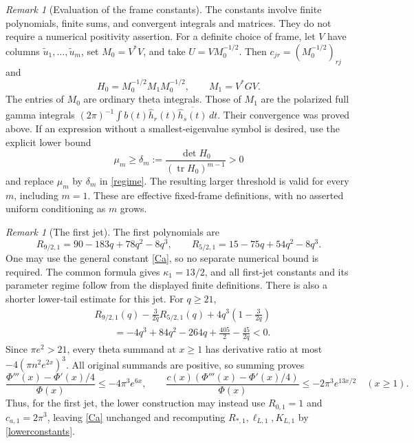 \documentclass[11pt]{article}
\theoremstyle{remark}
\newtheorem{remark}[theorem]{Remark}
\newcommand{\dd}{\,d}
\newcommand{\tr}{\operatorname{tr}}
\begin{document}
\begin{remark}[Evaluation of the frame constants]
The constants involve finite polynomials, finite sums, and
convergent integrals and matrices. They do not require a numerical
positivity assertion. For a definite choice of frame, let
\(V\) have columns \(\widetilde u_1,\ldots,\widetilde u_m\), set
\(M_0=V^*V\), and take \(U=VM_0^{-1/2}\).
Then \(c_{jr}=(M_0^{-1/2})_{rj}\) and
\[
 H_0=M_0^{-1/2}M_1M_0^{-1/2},\qquad
 M_1=V^*GV.
\]
The entries of \(M_0\) are ordinary theta integrals.
Those of \(M_1\) are the polarized full gamma integrals
\((2\pi)^{-1}\int b(t)\widehat h_r(t)
\overline{\widehat h_s(t)}\dd t\).
Their convergence was proved above.
If an expression without a smallest-eigenvalue symbol is desired,
use the explicit lower bound
\[
 \mu_m\ge \delta_m:=
       \frac{\det H_0}{(\tr H_0)^{m-1}}>0
\]
and replace \(\mu_m\) by \(\delta_m\) in \eqref{regime}.
The resulting larger threshold is valid for every \(m\), including
\(m=1\). These are effective fixed-frame definitions, with no
asserted uniform conditioning as \(m\) grows.
\end{remark}

\begin{remark}[The first jet]
The first polynomials are
\[
 R_{9/2,1}=90-183q+78q^2-8q^3,\qquad
 R_{5/2,1}=15-75q+54q^2-8q^3.
\]
One may use the general constant \eqref{Ca}, so no separate
numerical bound is required. The common formula gives
\(\kappa_1=13/2\), and all first-jet constants and its parameter
regime follow from the displayed finite definitions.
There is also a shorter lower-tail estimate for this jet.
For \(q\ge21\),
\begin{align*}
 &R_{9/2,1}(q)-\frac{3}{2q}R_{5/2,1}(q)
                       +4q^3\left(1-\frac3{2q}\right)\\
 &\hspace{2em}=-4q^3+84q^2-264q+\frac{405}{2}-\frac{45}{2q}<0.
\end{align*}
Since \(\pi e^2>21\), every theta summand at \(x\ge1\) has
derivative ratio at most \(-4(\pi n^2e^{2x})^3\).
All original summands are positive, so summing proves
\[
 \frac{\Phi'''(x)-\Phi'(x)/4}{\Phi(x)}
        \le-4\pi^3e^{6x},\qquad
 \frac{c(x)(\Phi'''(x)-\Phi'(x)/4)}{\Phi(x)}
        \le-2\pi^3e^{13x/2}\quad(x\ge1).
\]
Thus, for the first jet, the lower construction may instead use
\(R_{0,1}=1\) and \(c_{a,1}=2\pi^3\), leaving
\eqref{Ca} unchanged and recomputing
\(R_{*,1},\ell_{L,1},K_{L,1}\) by \eqref{lowerconstants}.
\end{remark}
\end{document}
